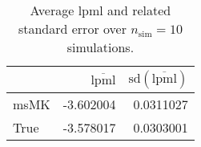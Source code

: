 \begin{table}[H]

\caption{Average lpml and related standard error over $n_{\text{sim}} = 10$ simulations.}
\centering
\begin{tabular}[t]{lrr}
\toprule
  & $\overbar{\text{lpml}}$ & $\text{sd}(\overbar{\text{lpml}})$\\
\midrule
msMK & -3.602004 & 0.0311027\\
True & -3.578017 & 0.0303001\\
\bottomrule
\end{tabular}
\end{table}